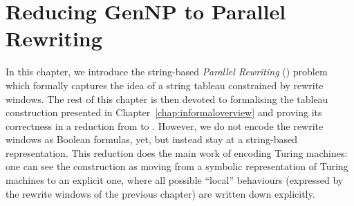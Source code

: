 \newcommand{\winw}[2]{\textsf{window}_{#1}{(#2)}}
\newcommand{\win}[1]{\textsf{window}{(#1)}}
\newcommand{\str}[1]{#1^*}
\newcommand{\prem}[1]{\textsf{prem}~#1}
\newcommand{\conc}[1]{\textsf{conc}~#1}
\newcommand{\rewHead}[3]{\textsf{rewHead}~#1~#2~#3}
\newcommand{\rewAt}[4]{\textsf{rewAt}~#1~#2~#3~#4}
\newcommand{\prefix}[2]{\textsf{prefix}~#1~#2}

\newcommand{\strentE}[1]{\rightsquigarrow_{#1}^E}
\renewcommand{\strent}[1]{\rightsquigarrow_{#1}}

\newcommand{\pFlip}[1]{\textsf{pFlip}~#1}
\newcommand{\pFlipi}[1]{\text{\textasciitilde}#1}
\newcommand{\pRev}{\textsf{pRev}}

\newcommand{\nilstr}[2]{E~#1~#2}

\newcommand{\divides}{\mid}
\newcommand{\notdivides}{\nmid}

\newcommand{\Rtape}{\ensuremath{R_{\text{tape}}}}
\newcommand{\Rtrans}{\ensuremath{R_{\text{trans}}}}
\newcommand{\Rhalt}{\ensuremath{R_{\text{halt}}}}
\newcommand{\Rsim}{\ensuremath{R_{\text{sim}}}}

\newcommand{\isSpecStateSym}[2]{\textsf{stateSym}~#1~#2}
\newcommand{\haltString}[1]{\textsf{haltingString}~#1}
\newcommand{\validCert}[1]{\textsf{validCert}~#1}
\newcommand{\validInput}[1]{\textbf{REPLACE ME}}

\newcommand{\stringForTapeHalf}{\textsf{stringForTapeHalf}}
\newcommand{\stringForConfig}{\textsf{stringForConfig}}

\chapter{Reducing GenNP to Parallel Rewriting}\label{chap:gennp_pr}
In this chapter, we introduce the string-based \emph{Parallel Rewriting} (\PR{}) problem which formally captures the idea of a string tableau constrained by rewrite windows. 
The rest of this chapter is then devoted to formalising the tableau construction presented in Chapter~\ref{chap:informaloverview} and proving its correctness in a reduction from \gennp{} to \PR{}.
However, we do not encode the rewrite windows as Boolean formulas, yet, but instead stay at a string-based representation.
This reduction does the main work of encoding Turing machines: one can see the construction as moving from a symbolic representation of Turing machines to an explicit one, where all possible ``local'' behaviours (expressed by the rewrite windows of the previous chapter) are written down explicitly. 

